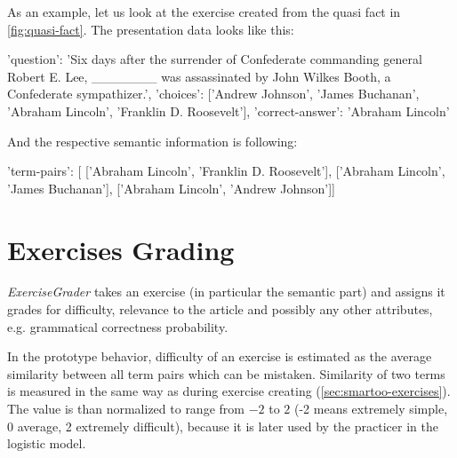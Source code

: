 \documentclass[12pt, twoside]{fithesis2}		%
\renewcommand{\_}{\leavevmode \kern0.07em\vbox{\hrule width0.4em}}
\newcounter{choice}
\renewcommand\thechoice{\Alph{choice}}
\newcommand\choicelabel{\thechoice.}
\newenvironment{choices}%
  {\vspace{0.8em}\list{\choicelabel}%
     {\usecounter{choice}\def\makelabel##1{\hss\llap{##1}}%
       \settowidth{\leftmargin}{W.\hskip\labelsep\hskip 0.01em}%
       \def\choice{%
         \item
       } %
       \labelwidth\leftmargin\advance\labelwidth-\labelsep
       \topsep=0pt
       \partopsep=0pt
     }%
  }%
  {\vspace{-0.7em}\endlist}
\newenvironment{question}
{
  \begin{center}
  \vspace{-0.5em}
  \begin{tabular}{p{0.9\textwidth}}
}
{
  \\
  \end{tabular}
  \vspace{-1em}
  \end{center}
}
\newcommand{\sentenceGap}{\rule{1.5cm}{0.4pt}~}
\begin{document}
As an example, let us look at the exercise created from the quasi fact in \autoref{fig:quasi-fact}. The presentation data looks like this:
\begin{code}
{'question': 'Six days after the surrender of Confederate commanding
              general Robert E. Lee, _______ was assassinated by
              John Wilkes Booth, a Confederate sympathizer.',
'choices': ['Andrew Johnson', 'James Buchanan',
            'Abraham Lincoln', 'Franklin D. Roosevelt'],
'correct-answer': 'Abraham Lincoln'}
\end{code}



\noindent
And the respective semantic information is following:
\begin{code}
{'term-pairs': [
    ['Abraham Lincoln', 'Franklin D. Roosevelt'],
    ['Abraham Lincoln', 'James Buchanan'],
    ['Abraham Lincoln', 'Andrew Johnson']]}
\end{code}

\section{Exercises Grading}
\label{sec:smartoo-exercises-grading}

\textit{ExerciseGrader} takes an exercise (in particular the semantic part) and assigns it grades for difficulty, relevance to the article and possibly any other attributes, e.g. grammatical correctness probability.

In the prototype behavior, difficulty of an exercise is estimated as the average similarity between all term pairs which can be mistaken.
Similarity of two terms is measured in the same way as during exercise creating (\autoref{sec:smartoo-exercises}).
The value is than normalized to range from $-2$ to $2$
(-2 means extremely simple, 0 average, 2 extremely difficult),
because it is later used by the practicer in the logistic model.
\end{document}
